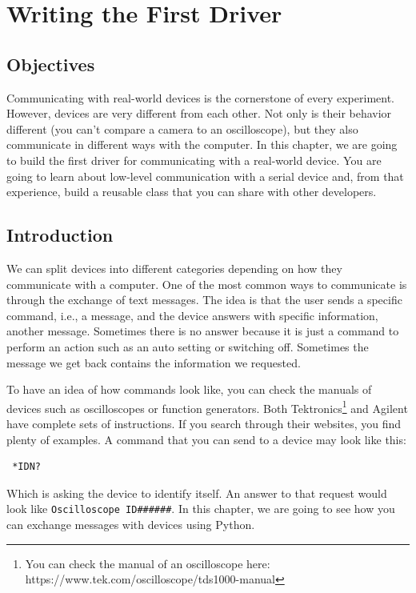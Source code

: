 \chapter{Writing the First Driver}\label{chapter:first-driver}
\section{Objectives}
Communicating with real-world devices is the cornerstone of every experiment. However, devices are very different from each other. Not only is their behavior different (you can't compare a camera to an oscilloscope), but they also communicate in different ways with the computer. In this chapter,
we are going to build the first driver for communicating with a real-world device. You are going to learn about low-level communication with a serial device and, from that experience, build a reusable class that you can share with other developers.

\section{Introduction}
We can split devices into different categories depending on how they communicate with a computer. One of the most common ways to communicate is through the exchange of text messages. The idea is that the user sends a specific command, i.e., a message, and the device answers with specific information, another message. Sometimes there is no answer because it is just a command to perform an action such as an auto setting or switching off. Sometimes the message we get back contains the information we requested.

To have an idea of how commands look like, you can check the manuals of devices such as oscilloscopes or function generators. Both Tektronics\footnote{You can check the manual of an oscilloscope here: https://www.tek.com/oscilloscope/tds1000-manual} and Agilent have complete sets of instructions. If you search through their websites, you find plenty of examples. A command that you can send to a device may look like this:

\begin{verbatim}
 *IDN?
\end{verbatim}

Which is asking the device to identify itself. An answer to that request would look like \texttt{Oscilloscope ID\#\#\#\#\#\#}. In this chapter, we are going to see how you can exchange messages with devices using Python.

